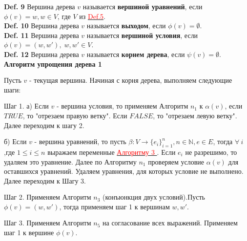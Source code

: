 \documentclass[12pt]{article}
\begin{document}
     {\bf Def. 9} Вершина дерева $v$ называется {\bf вершиной уравнений}, если
     $\phi(v)=w , w \in V$, где $V$ из \hyperlink{d5}{ \textcolor{red}{Def.5}}.
     \\
     
     {\bf Def. 10} Вершина дерева $v$ называется {\bf выходом}, если
     $\phi(v)= \emptyset$.
     \\
      
     {\bf Def. 11} Вершина дерева $v$ называется {\bf вершиной условия}, если
     $\phi(v)=(w,w') ,\; w,w' \in V$.
     \\
     
     {\bf Def. 12}  Вершина дерева $v$ называется {\bf корнем дерева}, если
      $\psi(v) = \emptyset$.
      \\
      
     {\bf Алгоритм упрощения дерева 1} 
     
     Пусть $v$ - текущая вершина.
     Начиная с корня дерева, выполняем следующие шаги:
     
     Шаг 1. а) Если $v$ - вершина условия, то применяем Алгоритм $n_{1}$ к  $\alpha(v)$, если $TRUE$, то "отрезаем правую ветку". Если $FALSE$, то "отрезаем левую ветку". Далее переходим к шагу 2.
     
     б) Если $v$ - вершина уравнений, то пусть $\beta : V \rightarrow \lbrace  e_{i}  \rbrace_{i=1}^{n}, n \in \mathbb{N}, e \in E$, тогда $\forall \: i$,где $ 1 \leq i \leq n$ выражаем переменные \hyperlink{a3}{ \textcolor{red}{Алгоритму 3 }}. Если $e_{i} $ не разрешимо, то удаляем это уравнение. Далее по Алгоритму $n_{1}$ проверяем условие $\alpha(v)$ для оставшихся уравнений. Удаляем уравнения, для которых условие не выполнено. Далее переходим к Шагу 3.
          
     Шаг 2. Применяем  Алгоритм $n_{3}$ (конъюнкция двух условий).Пусть $\phi(v)=(w,w')$, тогда применяем шаг 1 к вершинам $w, w'$.
     
     Шаг 3. Применяем  Алгоритм $n_{5}$ на согласование  всех выражений. Применяем шаг 1 к вершине $\phi(v)$.
     
     
     
     
     
     
     
\end{document}

